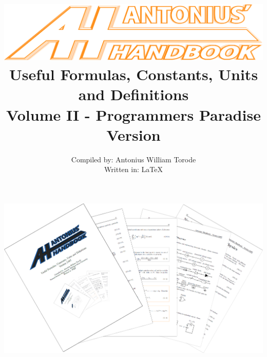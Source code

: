 \documentclass[openany,twoside, notitlepage,letterpaper,11pt]{book}
\title{\includegraphics[scale=.22]{./Images/Covers/AH3.png}
	\\ \vspace{1.5cm} Useful Formulas, Constants, Units and Definitions \\ Volume II - Programmers Paradise \\ Version \Version}
\date{}
\author{Compiled by: Antonius William Torode\\ Written in: \LaTeX}
\begin{document}
\frontmatter
\maketitle
\thispagestyle{empty}
\pagestyle{empty}
\begin{center}
	\includegraphics[scale=1.8]{./Images/Covers/background_tunnel.png}
\end{center}





\thispagestyle{empty}

\tableofcontents


\setlength{\parindent}{0pt}
\mainmatter
\pagestyle{fancy}


\newpage


\newpage


\newpage


%

\newpage


\newpage


\newpage

\end{document}
